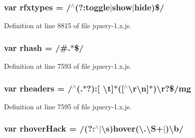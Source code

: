 \subsubsection[{\texorpdfstring{rfxtypes}{rfxtypes}}]{\setlength{\rightskip}{0pt plus 5cm}var rfxtypes = /$^\wedge$(?\+:{\bf toggle}$\vert$show$\vert$hide)\$/}\hypertarget{jquery-1_8x_8js_a28b1e14ecaade6675453a292b2c1dba6}{}\label{jquery-1_8x_8js_a28b1e14ecaade6675453a292b2c1dba6}


Definition at line 8815 of file jquery-\/1.\+x.\+js.

\subsubsection[{\texorpdfstring{rhash}{rhash}}]{\setlength{\rightskip}{0pt plus 5cm}var rhash = /\#.$\ast$\$/}\hypertarget{jquery-1_8x_8js_a6990b6955b6bec9dd39f3814cfb56d6d}{}\label{jquery-1_8x_8js_a6990b6955b6bec9dd39f3814cfb56d6d}


Definition at line 7593 of file jquery-\/1.\+x.\+js.

\subsubsection[{\texorpdfstring{rheaders}{rheaders}}]{\setlength{\rightskip}{0pt plus 5cm}var rheaders = /$^\wedge$(.$\ast$?)\+:\mbox{[} \textbackslash{}{\bf t}\mbox{]}$\ast$(\mbox{[}$^\wedge$\textbackslash{}{\bf r\textbackslash{}n}\mbox{]}$\ast$)\textbackslash{}r?\$/mg}\hypertarget{jquery-1_8x_8js_af506d11612139f03091db71089d92e8b}{}\label{jquery-1_8x_8js_af506d11612139f03091db71089d92e8b}


Definition at line 7595 of file jquery-\/1.\+x.\+js.

\subsubsection[{\texorpdfstring{rhover\+Hack}{rhoverHack}}]{\setlength{\rightskip}{0pt plus 5cm}var rhover\+Hack = /(?\+:$^\wedge$$\vert$\textbackslash{}{\bf s})hover(\textbackslash{}.\textbackslash{}{\bf S}+$\vert$)\textbackslash{}{\bf b}/}\hypertarget{jquery-1_8x_8js_a7b035462889195e00316a894a2b3d876}{}\label{jquery-1_8x_8js_a7b035462889195e00316a894a2b3d876}


